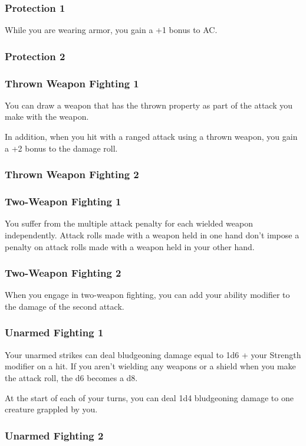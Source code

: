 \subsubsection{Protection 1}
    While you are wearing armor, you gain a +1 bonus to AC.
\subsubsection{Protection 2}
\subsubsection{Thrown Weapon Fighting 1}
    You can draw a weapon that has the thrown property as part of the attack you make with the weapon.

    In addition, when you hit with a ranged attack using a thrown weapon, you gain a +2 bonus to the damage roll.
\subsubsection{Thrown Weapon Fighting 2}
\subsubsection{Two-Weapon Fighting 1}
    You suffer from the multiple attack penalty for each wielded weapon independently.
    Attack rolls made with a weapon held in one hand don't impose a penalty on attack rolls made with a weapon held in your other hand.
\subsubsection{Two-Weapon Fighting 2}
    When you engage in two-weapon fighting, you can add your ability modifier to the damage of the second attack.
\subsubsection{Unarmed Fighting 1}
    Your unarmed strikes can deal bludgeoning damage equal to 1d6 + your Strength modifier on a hit.
    If you aren't wielding any weapons or a shield when you make the attack roll, the d6 becomes a d8.

    At the start of each of your turns, you can deal 1d4 bludgeoning damage to one creature grappled by you.
\subsubsection{Unarmed Fighting 2}


